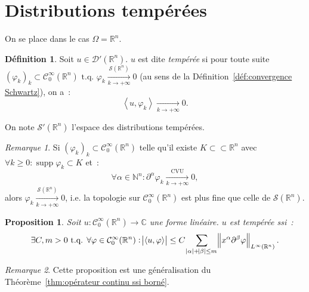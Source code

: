 \documentclass{report}
\DeclareMathOperator{\supp}{supp}
\newcommand{\C}{{\mathbb C}}
\newcommand{\R}{{\mathbb R}}
\newcommand{\N}{{\mathbb N}}
\newcommand{\scpr}[2]{\left\langle#1, #2\right\rangle}
\newcommand{\tq}{\text{ t.q. }}
\newcommand{\st}{\tq}
\newcommand{\pinfty}{{+\infty}}
\newtheorem{prp}[thm]{Proposition}
\theoremstyle{definition}
\newtheorem{déf}[thm]{Définition}
\theoremstyle{remark}
\newtheorem*{rmq}{Remarque}
\begin{document}
\section{Distributions tempérées}
On se place dans le cas $\Omega = \R^n$.

\begin{déf} Soit $u \in \mathcal D'(\R^n)$. $u$ est dite \textit{tempérée} si pour toute suite
$(\varphi_k)_k \subset \mathcal C^\infty_0(\R^n) \st \varphi_k \xrightarrow[k \to \pinfty]{\mathcal S(\R^n)} 0$ (au sens de la Définition~\ref{déf:convergence Schwartz}), on a~:
\[\scpr u{\varphi_k} \xrightarrow[k \to \pinfty]{} 0.\]

On note $\mathcal S'(\R^n)$ l'espace des distributions tempérées.
\end{déf}

\begin{rmq} Si $(\varphi_k)_k \subset \mathcal C^\infty_0(\R^n)$ telle qu'il existe $K \subset\subset \R^n$ avec $\forall k \geq 0 : \supp \varphi_k \subset K$ et~:
\[\forall \alpha \in \N^n : \partial^\alpha \varphi_k \xrightarrow[k \to \pinfty]{\text{CVU}} 0,\]
alors $\varphi_k \xrightarrow[k \to \pinfty]{\mathcal S(\R^n)} 0$, i.e. la topologie sur $\mathcal C^\infty_0(\R^n)$ est plus fine que celle de $\mathcal S(\R^n)$.
\end{rmq}

\begin{prp}\label{prp:borné ssi continu distributions tempérées} Soit $u : \mathcal C^\infty_0(\R^n) \to \C$ une forme linéaire. $u$ est tempérée ssi~:
\[\exists C, m > 0 \st \forall \varphi \in \mathcal C^\infty_0(\R^n) : \abs {\scpr u\varphi} \leq C\sum_{\abs \alpha + \abs \beta \leq m}\norm {x^\alpha\partial^\beta\varphi}_{L^\infty(\R^n)}.\]
\end{prp}

\begin{rmq}Cette proposition est une généralisation du Théorème~\ref{thm:opérateur continu ssi borné}.
\end{rmq}
\end{document}
